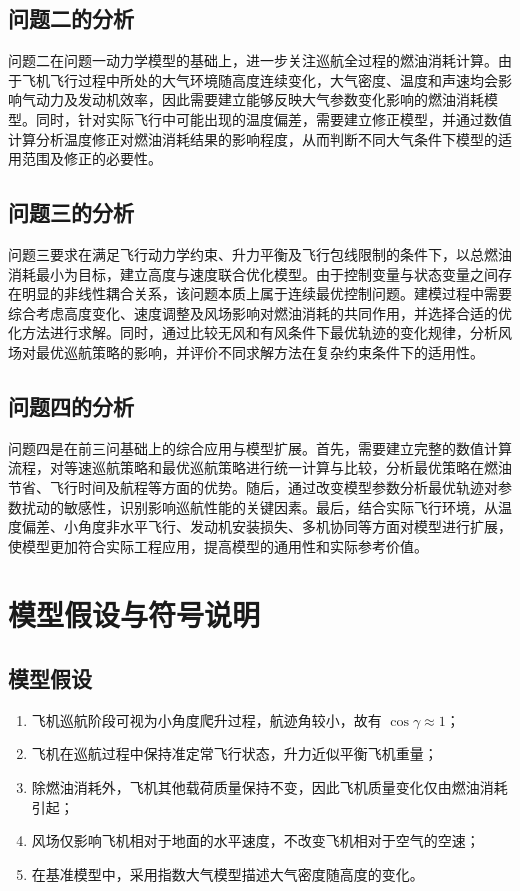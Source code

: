 \documentclass[withoutpreface,bwprint]{cumcmthesis} %
\begin{document}
\subsection{问题二的分析}
问题二在问题一动力学模型的基础上，进一步关注巡航全过程的燃油消耗计算。由于飞机飞行过程中所处的大气环境随高度连续变化，大气密度、温度和声速均会影响气动力及发动机效率，因此需要建立能够反映大气参数变化影响的燃油消耗模型。同时，针对实际飞行中可能出现的温度偏差，需要建立修正模型，并通过数值计算分析温度修正对燃油消耗结果的影响程度，从而判断不同大气条件下模型的适用范围及修正的必要性。

\subsection{问题三的分析}
问题三要求在满足飞行动力学约束、升力平衡及飞行包线限制的条件下，以总燃油消耗最小为目标，建立高度与速度联合优化模型。由于控制变量与状态变量之间存在明显的非线性耦合关系，该问题本质上属于连续最优控制问题。建模过程中需要综合考虑高度变化、速度调整及风场影响对燃油消耗的共同作用，并选择合适的优化方法进行求解。同时，通过比较无风和有风条件下最优轨迹的变化规律，分析风场对最优巡航策略的影响，并评价不同求解方法在复杂约束条件下的适用性。

\subsection{问题四的分析}
问题四是在前三问基础上的综合应用与模型扩展。首先，需要建立完整的数值计算流程，对等速巡航策略和最优巡航策略进行统一计算与比较，分析最优策略在燃油节省、飞行时间及航程等方面的优势。随后，通过改变模型参数分析最优轨迹对参数扰动的敏感性，识别影响巡航性能的关键因素。最后，结合实际飞行环境，从温度偏差、小角度非水平飞行、发动机安装损失、多机协同等方面对模型进行扩展，使模型更加符合实际工程应用，提高模型的通用性和实际参考价值。


\section{模型假设与符号说明}

\subsection{模型假设}
\begin{enumerate}
    \item 飞机巡航阶段可视为小角度爬升过程，航迹角较小，故有 $\cos\gamma\approx 1$；
    \item 飞机在巡航过程中保持准定常飞行状态，升力近似平衡飞机重量；
    \item 除燃油消耗外，飞机其他载荷质量保持不变，因此飞机质量变化仅由燃油消耗引起；
    \item 风场仅影响飞机相对于地面的水平速度，不改变飞机相对于空气的空速；
    \item 在基准模型中，采用指数大气模型描述大气密度随高度的变化。
\end{enumerate}
\end{document}
